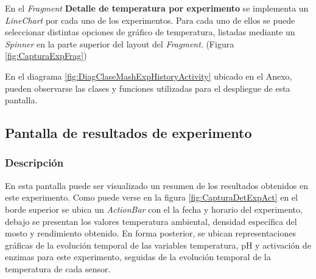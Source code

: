             \par En el \textit{Fragment} \textbf{Detalle de temperatura por experimento} se implementa un \textit{LineChart} por cada uno de los experimentos. Para cada uno de ellos se puede seleccionar distintas opciones de gráfico de temperatura, listadas mediante un \textit{Spinner} en la parte superior del layout del \textit{Fragment}.  (Figura \ref{fig:CapturaExpFrag})
            
            
            \par En el diagrama \ref{fig:DiagClaseMashExpHistoryActivity} ubicado en el Anexo, pueden observarse las clases y funciones utilizadas para el despliegue de esta pantalla.
        
        \subsection{Pantalla de resultados de experimento}
        \label{DescripPantallaResultadosExperimento}
            \subsubsection{Descripción}
            En esta pantalla puede ser visualizado un resumen de los resultados obtenidos en este experimento.
            Como puede verse en la figura \ref{fig:CapturaDetExpAct} en el borde superior se ubica un \textit{ActionBar} con el la fecha y horario del experimento, debajo se presentan los valores temperatura ambiental, densidad específica del mosto y rendimiento obtenido. En forma posterior, se ubican representaciones gráficas de la evolución temporal de las variables temperatura, pH y activación de enzimas para este experimento, seguidas de la evolución temporal de la temperatura de cada sensor.
            
